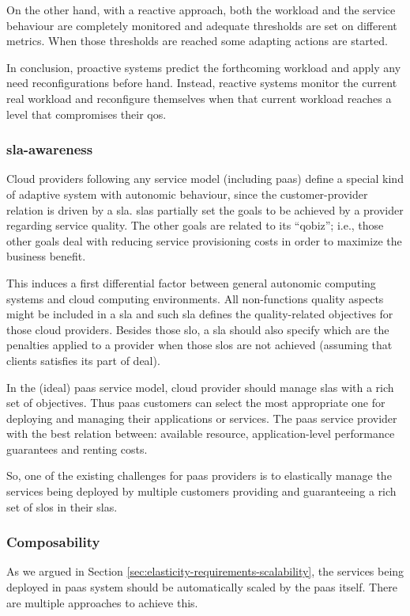 On the other hand, with a reactive approach, both the workload and the service behaviour are completely
monitored and adequate thresholds are set on different metrics. When those thresholds are reached some
adapting actions are started.

In conclusion, proactive systems predict the forthcoming workload and apply any need reconfigurations
before hand. Instead, reactive systems monitor the current real workload and reconfigure themselves
when that current workload reaches a level that compromises their \ac{qos}.

\subsubsection*{\acs{sla}-awareness}
\label{sec:elasticity-requirements-slaAwareness}
Cloud providers following any service model (including \ac{paas}) define a special kind of adaptive
system with autonomic behaviour, since the customer-provider relation is driven by a \ac{sla}.
\ac{sla}s partially set the goals to be achieved by a provider regarding service quality. The other
goals are related to its ``\ac{qobiz}''; i.e., those other goals deal with reducing service provisioning
costs in order to maximize the business benefit.

This induces a first differential factor between general autonomic computing systems and cloud computing
environments. All non-functions quality aspects might be included in a \ac{sla} and such \ac{sla} 
defines the quality-related objectives for those cloud providers. Besides those \ac{slo}, a \ac{sla}
should also specify which are the penalties applied to a provider when those \ac{slo}s are not achieved
(assuming that clients satisfies its part of deal).

In the (ideal) \ac{paas} service model, cloud provider should manage \ac{sla}s with a rich set of objectives.
Thus \ac{paas} customers can select the most appropriate one for deploying and managing their applications
or services. The \ac{paas} service provider with the best relation between: available resource,
application-level performance guarantees and renting costs.

So, one of the existing challenges for \ac{paas} providers is to elastically manage the services being
deployed by multiple customers providing and guaranteeing a rich set of \ac{slo}s in their \ac{sla}s.

\subsubsection*{Composability}
\label{sec:elasticity-requirements-composability}
As we argued in Section \ref{sec:elasticity-requirements-scalability}, the services being deployed in
\ac{paas} system should be automatically scaled by the \ac{paas} itself. There are multiple approaches
to achieve this.

